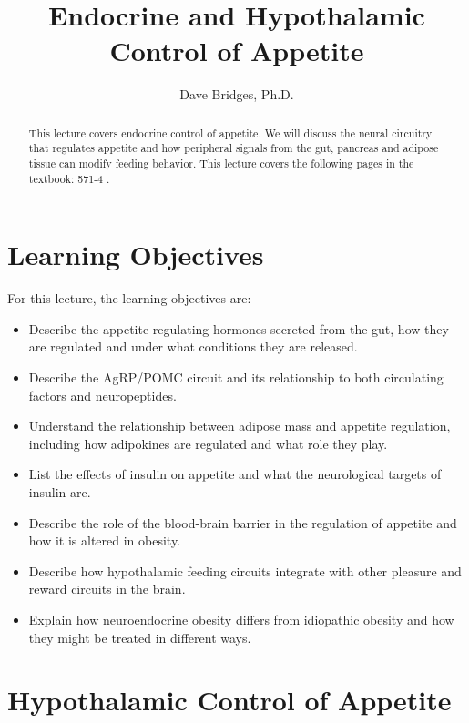 \documentclass{tufte-handout}
\title{Endocrine and Hypothalamic Control of Appetite}
\author{Dave Bridges, Ph.D.}
\begin{document}
\maketitle%

\begin{abstract}
\noindent This lecture covers endocrine control of appetite.  We will discuss the neural circuitry that regulates appetite and how peripheral signals from the gut, pancreas and adipose tissue can modify feeding behavior.  This lecture covers the following pages in the textbook: 571-4 \cite{Widmaier2013}.  
\end{abstract}

\tableofcontents

\pagebreak

\section{Learning Objectives}
For this lecture, the learning objectives are:
\begin{itemize}
\item Describe the appetite-regulating hormones secreted from the gut, how they are regulated and under what conditions they are released.
\item Describe the AgRP/POMC circuit and its relationship to both circulating factors and neuropeptides.
\item Understand the relationship between adipose mass and appetite regulation, including how adipokines are regulated and what role they play.
\item List the effects of insulin on appetite and what the neurological targets of insulin are.
\item Describe the role of the blood-brain barrier in the regulation of appetite and how it is altered in obesity.
\item Describe how hypothalamic feeding circuits integrate with other pleasure and reward circuits in the brain.
\item Explain how neuroendocrine obesity differs from idiopathic obesity and how they might be treated in different ways.

\end{itemize}

\section{Hypothalamic Control of Appetite}
\end{document}
